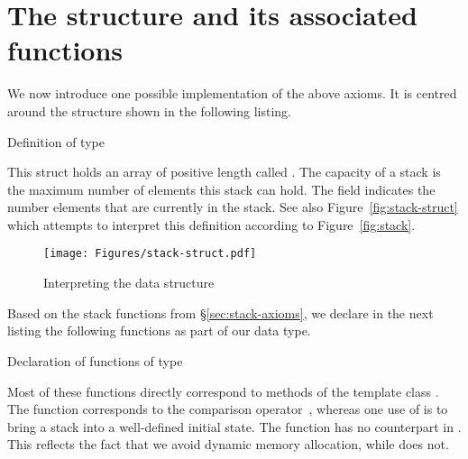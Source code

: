 
\section{The structure \stacktype and its associated functions}

We now introduce one possible \isoc implementation of the above axioms.
It is centred around the \isoc structure \stacktype shown in the following listing.

\begin{listing}[hbt]
\centering
\begin{minipage}{0.9\textwidth}

\end{minipage}
\caption{Definition of type \stacktype}
\end{listing}

This struct holds an array  of positive length called . 
The capacity of a stack is the maximum number of elements this stack can hold.
The field  indicates the number elements that
are currently in the stack.
See also Figure~\ref{fig:stack-struct} which attempts to interpret
this definition according to Figure~\ref{fig:stack}.

\begin{figure}[hbt]
\centering
\texttt{[image: Figures/stack-struct.pdf]}
\caption{Interpreting the data structure \stacktype}
\end{figure}

\FloatBarrier
\clearpage

Based on the stack functions from \S\ref{sec:stack-axioms},
we declare in the next listing the following functions as part of
our \stacktype data type.

\begin{listing}[hbt]
\centering
\begin{minipage}{0.9\textwidth}

\end{minipage}
\caption{Declaration of functions of type \stacktype}
\end{listing}

Most of these functions directly correspond to methods of the
\cxx {} template class \cite[\S 26.6.6.1]{cxx-17-draft}.
The function \stackequal corresponds to the comparison operator~\inl{==},
whereas one use of \stackinit is to bring a stack into a
well-defined initial state.
The function \stackfull has no counterpart in .
This reflects the fact that we 
avoid dynamic memory allocation, while  does not.

